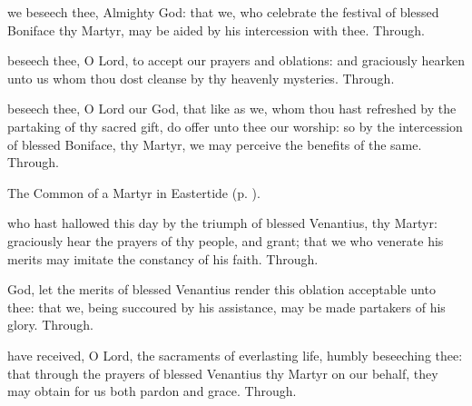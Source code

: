 \vspace{-0.15\baselineskip}

\collect

\vspace{-0.1\baselineskip}

 we beseech thee, Almighty God: that we, who celebrate the festival of blessed Boniface thy Martyr, may be aided by his intercession with thee. Through.

\vspace{-0.15\baselineskip}

\secret

\vspace{-0.1\baselineskip}

 beseech thee, O Lord, to accept our prayers and oblations: and graciously hearken unto us whom thou dost cleanse by thy heavenly mysteries. Through.

\vspace{-0.15\baselineskip}

\postcommunion

\vspace{-0.1\baselineskip}

 beseech thee, O Lord our God, that like as we, whom thou hast refreshed by the partaking of thy sacred gift, do offer unto thee our worship: so by the intercession of blessed Boniface, thy Martyr, we may perceive the benefits of the same. Through.


\clearpage
{}

\begin{rubric}
	The Common of a Martyr in Eastertide (p. \pageref{CommonMartyrEaster}).
\end{rubric}

\collect
{} who hast hallowed this day by the triumph of blessed Venantius, thy Martyr: graciously hear the prayers of thy people, and grant; that we who venerate his merits may imitate the constancy of his faith. Through.

\secret
{} God, let the merits of blessed Venantius render this oblation acceptable unto thee: that we, being succoured by his assistance, may be made partakers of his glory. Through.

\postcommunion
{} have received, O Lord, the sacraments of everlasting life, humbly beseeching thee: that through the prayers of blessed Venantius thy Martyr on our behalf, they may obtain for us both pardon and grace. Through.


